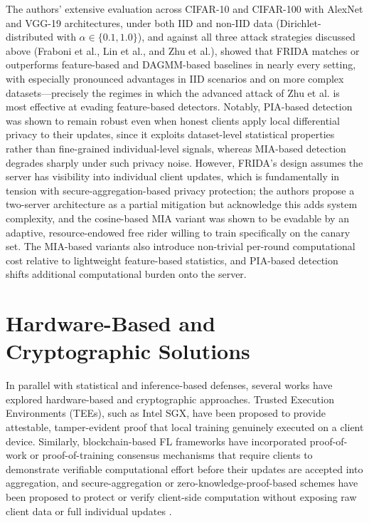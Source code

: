 The authors' extensive evaluation across CIFAR-10 and CIFAR-100 with AlexNet and VGG-19 architectures, under both IID and non-IID data (Dirichlet-distributed with $\alpha \in \{0.1, 1.0\}$), and against all three attack strategies discussed above (Fraboni et al., Lin et al., and Zhu et al.), showed that FRIDA matches or outperforms feature-based and DAGMM-based baselines in nearly every setting, with especially pronounced advantages in IID scenarios and on more complex datasets—precisely the regimes in which the advanced attack of Zhu et al. is most effective at evading feature-based detectors. Notably, PIA-based detection was shown to remain robust even when honest clients apply local differential privacy to their updates, since it exploits dataset-level statistical properties rather than fine-grained individual-level signals, whereas MIA-based detection degrades sharply under such privacy noise. However, FRIDA's design assumes the server has visibility into individual client updates, which is fundamentally in tension with secure-aggregation-based privacy protection; the authors propose a two-server architecture as a partial mitigation but acknowledge this adds system complexity, and the cosine-based MIA variant was shown to be evadable by an adaptive, resource-endowed free rider willing to train specifically on the canary set. The MIA-based variants also introduce non-trivial per-round computational cost relative to lightweight feature-based statistics, and PIA-based detection shifts additional computational burden onto the server.

\section{Hardware-Based and Cryptographic Solutions}
\label{subsec:hardware-based}

In parallel with statistical and inference-based defenses, several works have explored hardware-based and cryptographic approaches. Trusted Execution Environments (TEEs), such as Intel SGX, have been proposed to provide attestable, tamper-evident proof that local training genuinely executed on a client device. Similarly, blockchain-based FL frameworks have incorporated proof-of-work or proof-of-training consensus mechanisms that require clients to demonstrate verifiable computational effort before their updates are accepted into aggregation, and secure-aggregation or zero-knowledge-proof-based schemes have been proposed to protect or verify client-side computation without exposing raw client data or full individual updates \cite{bonawitz2017practical}.

